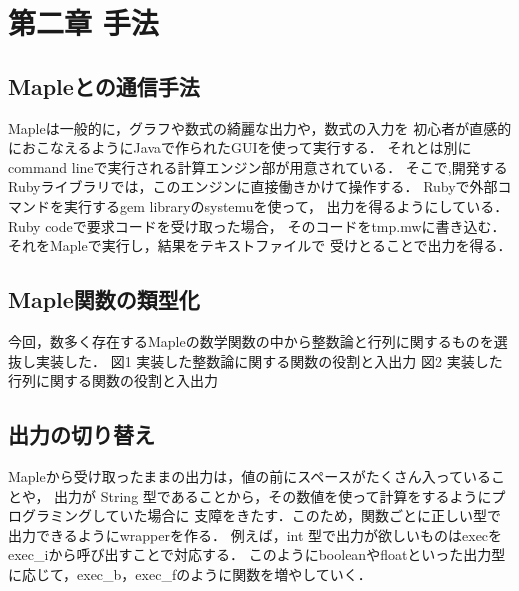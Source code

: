 \section{第二章 手法}
\subsection{Mapleとの通信手法}
Mapleは一般的に，グラフや数式の綺麗な出力や，数式の入力を
初心者が直感的におこなえるようにJavaで作られたGUIを使って実行する．
それとは別にcommand lineで実行される計算エンジン部が用意されている．
そこで,開発するRubyライブラリでは，このエンジンに直接働きかけて操作する．
Rubyで外部コマンドを実行するgem libraryのsystemuを使って，
出力を得るようにしている．Ruby codeで要求コードを受け取った場合，
そのコードをtmp.mwに書き込む．それをMapleで実行し，結果をテキストファイルで
受けとることで出力を得る．

\subsection{Maple関数の類型化}
今回，数多く存在するMapleの数学関数の中から整数論と行列に関するものを選抜し実装した．
図1 実装した整数論に関する関数の役割と入出力
図2 実装した行列に関する関数の役割と入出力

\subsection{出力の切り替え}
Mapleから受け取ったままの出力は，値の前にスペースがたくさん入っていることや，
出力が String 型であることから，その数値を使って計算をするようにプログラミングしていた場合に
支障をきたす．このため，関数ごとに正しい型で出力できるようにwrapperを作る．
例えば，int 型で出力が欲しいものはexecをexec\_iから呼び出すことで対応する．
このようにbooleanやfloatといった出力型に応じて，exec\_b，exec\_fのように関数を増やしていく．

